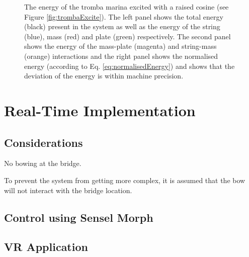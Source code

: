 \begin{figure}[h]
    \centering
      \caption{The energy of the tromba marina excited with a raised cosine (see Figure \ref{fig:trombaExcite}). The left panel shows the total energy (black) present in the system as well as the energy of the string (blue), mass (red) and plate (green) respectively. The second panel shows the energy of the mass-plate (magenta) and string-mass (orange) interactions and the right panel shows the normalised energy (according to Eq. \eqref{eq:normalisedEnergy}) and shows that the deviation of the energy is within machine precision. \label{fig:trombaEnergy}}
\end{figure}
\section{Real-Time Implementation}
\subsection{Considerations}
No bowing at the bridge.

To prevent the system from getting more complex, it is assumed that the bow will not interact with the bridge location. 

\subsection{Control using Sensel Morph}

\subsection{VR Application}
